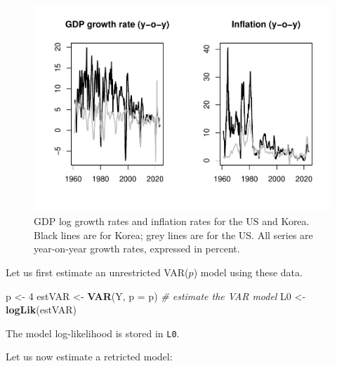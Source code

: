 \documentclass[
  12pt,
]{book}
\newenvironment{Shaded}{\begin{snugshade}}{\end{snugshade}}
\newcommand{\AttributeTok}[1]{\textcolor[rgb]{0.13,0.29,0.53}{#1}}
\newcommand{\CommentTok}[1]{\textcolor[rgb]{0.56,0.35,0.01}{\textit{#1}}}
\newcommand{\DecValTok}[1]{\textcolor[rgb]{0.00,0.00,0.81}{#1}}
\newcommand{\FunctionTok}[1]{\textcolor[rgb]{0.13,0.29,0.53}{\textbf{#1}}}
\newcommand{\NormalTok}[1]{#1}
\newcommand{\OtherTok}[1]{\textcolor[rgb]{0.56,0.35,0.01}{#1}}
\theoremstyle{definition}
\theoremstyle{definition}
\theoremstyle{definition}
\theoremstyle{definition}
\theoremstyle{remark}
\begin{document}
\begin{figure}
\includegraphics[width=0.95\linewidth]{IdentifStructShocks_files/figure-latex/VARdataUSAKOR-1} \caption{GDP log growth rates and inflation rates for the US and Korea. Black lines are for Korea; grey lines are for the US. All series are year-on-year growth rates, expressed in percent.}\label{fig:VARdataUSAKOR}
\end{figure}

Let us first estimate an unrestricted VAR(\(p\)) model using these data.

\begin{Shaded}
\begin{Highlighting}[]
\NormalTok{p }\OtherTok{\textless{}{-}} \DecValTok{4}
\NormalTok{estVAR }\OtherTok{\textless{}{-}} \FunctionTok{VAR}\NormalTok{(Y, }\AttributeTok{p =}\NormalTok{ p) }\CommentTok{\# estimate the VAR model}
\NormalTok{L0 }\OtherTok{\textless{}{-}} \FunctionTok{logLik}\NormalTok{(estVAR)}
\end{Highlighting}
\end{Shaded}

The model log-likelihood is stored in \texttt{L0}.

Let us now estimate a retricted model:
\end{document}
